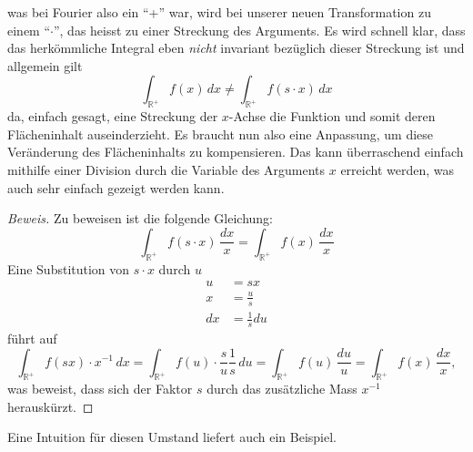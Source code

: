 was bei Fourier also ein ``+'' war, wird bei unserer neuen Transformation 
zu einem ``$\cdot$'', das heisst zu einer Streckung des Arguments. 
Es wird schnell klar, dass das herkömmliche Integral eben {\em nicht} 
invariant bezüglich dieser Streckung ist und allgemein gilt 
\begin{equation}
    \int_\mathbb{R^+} 
    f(x)\,{d}x \neq \int_\mathbb{R^+} f(s \cdot x)\,{d}x
    \label{mellin:ungl}
\end{equation}
da, einfach gesagt, eine Streckung der $x$-Achse die Funktion und somit deren 
Flächeninhalt auseinderzieht.
Es braucht nun also eine Anpassung, um diese Veränderung des Flächeninhalts 
zu kompensieren.
Das kann überraschend einfach mithilfe einer Division durch die Variable 
des Arguments $x$ erreicht werden, was auch sehr einfach gezeigt werden 
kann.
\begin{proof}[Beweis]
    Zu beweisen ist die folgende Gleichung:
    \[
        \int_\mathbb{R^+} f(s \cdot x)\,\frac{{d}x}{x} 
        = \int_\mathbb{R^+} f(x)\,\frac{{d}x}{x}
    \]
    Eine Substitution von $s \cdot x$ durch $u$
    \begin{align*}
        u &= sx \\
        x &= \frac{u}{s} \\
        {d}x &= \frac{1}{s} {d}u
    \end{align*}
    führt auf
    \[
        \int_\mathbb{R^+} f(sx) \cdot x^{-1}\,{d}x 
        = \int_\mathbb{R^+} f(u) \cdot \frac{s}{u} \frac{1}{s}\,{d}u
        = \int_\mathbb{R^+} f(u)\,\frac{{d}u}{u}
        = \int_\mathbb{R^+} f(x)\,\frac{{d}x}{x}
        ,
    \]
    was beweist, dass sich der Faktor $s$ durch das zusätzliche Mass 
    $x^{-1}$ herauskürzt.
\end{proof}
Eine Intuition für diesen Umstand liefert auch ein Beispiel.

